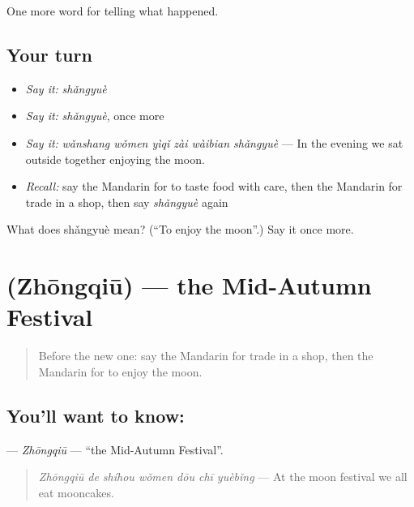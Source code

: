 \begin{grammarlens}[title={What you've built}]
One more word for telling what happened.
\end{grammarlens}

\subsection*{Your turn}
\begin{itemize}
\raggedright
  \item \emph{Say it:} \emph{shǎngyuè}
  \item \emph{Say it:} \emph{shǎngyuè}, once more
  \item \emph{Say it:} \emph{wǎnshang wǒmen yìqǐ zài wàibian shǎngyuè} — In the evening we sat outside together enjoying the moon.
  \item \emph{Recall:} say the Mandarin for to taste food with care, then the Mandarin for trade in a shop, then say \emph{shǎngyuè} again
\end{itemize}

\begin{tcolorbox}[breakable,colback=teal!4,colframe=teal!35!black,title={Before you move on}]
What does shǎngyuè mean? (\textquotedblleft{}To enjoy the moon\textquotedblright{}.) Say it once more.
\end{tcolorbox}
\section[\texorpdfstring{\zh{中秋} (Zhōngqiū)}{中秋 (Zhōngqiū)}]{ (Zhōngqiū) — the Mid-Autumn Festival}

\label{lesson:ZH-C342-zhongqiu}



\begin{quote}
Before the new one: say the Mandarin for trade in a shop, then the Mandarin for to enjoy the moon.
\end{quote}

\subsection*{You'll want to know: }
\textbf{} — \emph{Zhōngqiū} — \textquotedblleft{}the Mid-Autumn Festival\textquotedblright{}.

\begin{quote}
\textbf{} \emph{Zhōngqiū de shíhou wǒmen dōu chī yuèbǐng} — At the moon festival we all eat mooncakes.
\end{quote}

